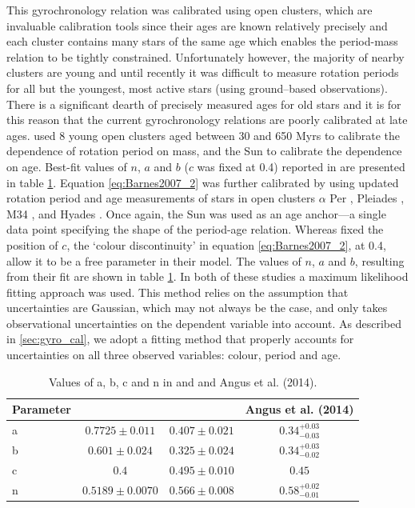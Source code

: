 \documentclass[useAMS, usenatbib]{mn2e}
\newcommand{\gyroa}{0.34}
\newcommand{\aerrp}{0.03}
\newcommand{\aerrm}{0.03}
\newcommand{\gyron}{0.58}
\newcommand{\nerrp}{0.02}
\newcommand{\nerrm}{0.01}
\newcommand{\gyrob}{0.34}
\newcommand{\berrm}{0.02}
\begin{document}
This gyrochronology relation was calibrated using open clusters, which are
invaluable calibration tools since their ages are known relatively precisely
and each cluster contains many stars of the same age which enables the
period-mass relation to be tightly constrained.
Unfortunately however, the majority of nearby clusters are young and until
recently it was difficult to measure rotation periods for all but the
youngest, most active stars (using ground--based observations).
There is a significant dearth of precisely measured ages for old stars and it
is for this reason that the current gyrochronology relations are poorly
calibrated at late ages.
\citet{Barnes2007} used 8 young open clusters aged between 30 and 650 Myrs to
calibrate the dependence of rotation period on mass, and the Sun to calibrate
the dependence on age.
Best-fit values of $n$, $a$ and $b$ ($c$ was fixed at 0.4) reported in
\citet{Barnes2007} are presented in table \ref{tab:constants}.
Equation \ref{eq:Barnes2007_2} was further calibrated by \citet{Mamajek2008}
using updated rotation period and age measurements of stars in open clusters
$\alpha$ Per \citep{Prosser1995}, Pleiades \citep{Prosser1995,
Krishnamurthi1998}, M34 \citep{Meibom2011_M34}, and Hyades \citep[Henry,
private comm.,][]{Radick1987, Radick1995, Prosser1995, Paulson2004}.
Once again, the Sun was used as an age anchor---a single data point specifying
the shape of the period-age relation.
Whereas \citet{Barnes2007} fixed the position of $c$, the `colour
discontinuity' in equation \ref{eq:Barnes2007_2}, at 0.4, \citet{Mamajek2008}
allow it to be a free parameter in their model.
The values of $n$, $a$ and $b$, resulting from their fit are shown in table
\ref{tab:constants}.
In both of these studies a maximum likelihood fitting approach was used.
This method relies on the assumption that uncertainties are Gaussian, which
may not always be the case, and only takes observational uncertainties on the
dependent variable into account.
As described in \textsection \ref{sec:gyro_cal}, we adopt a fitting method
that properly accounts for uncertainties on all three observed variables:
colour, period and age.

\begin{table}
\caption{Values of a, b, c and n in \citet{Barnes2007} and
    \citet{Mamajek2008} and Angus et al. (2014). \label{tab:constants}}
\begin{tabular}{lccc}
\hline\hline
    Parameter & \citet{Barnes2007} & \citet{Mamajek2008} & Angus et al. (2014) \\
    \hline
    a & $0.7725 \pm 0.011$ & $0.407 \pm 0.021$ & $\gyroa^{+\aerrp}_{-\aerrm}$ \\
    b & $0.601 \pm 0.024$ & $0.325 \pm 0.024$ & $\gyrob^{+\aerrp}_{-\berrm}$\\
    c & $0.4$ & $0.495 \pm 0.010$ & $0.45$ \\
    n & $0.5189 \pm 0.0070$ & $0.566 \pm 0.008$ & $\gyron^{+\nerrp}_{-\nerrm}$\\
\hline
\end{tabular}
\end{table}
\end{document}
